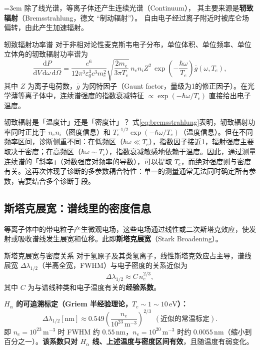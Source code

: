 \documentclass[12pt,a4paper,openany,oneside]{book}
\newcommand{\diff}{\mathrm{d}}
\newcommand{\eps}{\varepsilon}
\begin{document}
{\emergencystretch=3em
除了线光谱，等离子体还产生连续光谱（Continuum），
其主要来源是\textbf{轫致辐射}（Bremsstrahlung，德文 ``制动辐射''）。
自由电子经过离子附近时被库仑场偏转，由此产生加速辐射。\par}

\begin{theorem}{轫致辐射功率谱}{}{}
对于非相对论性麦克斯韦电子分布，单位体积、单位频率、单位立体角的轫致辐射功率谱为
\begin{equation}
\frac{\diff P}{\diff V\,\diff\omega\,\diff\Omega} = \frac{e^6}{12\pi^3\eps_0^3 c^3 m_e^2}\sqrt{\frac{2m_e}{3\pi T_e}}\,n_e n_i Z^2\,\exp\!\left(-\frac{\hbar\omega}{T_e}\right) \bar{g}(\omega, T_e),
\label{eq:bremsstrahlung}
\end{equation}
其中 $Z$ 为离子电荷数，$\bar{g}$ 为冈特因子（Gaunt factor，量级为1的修正因子）。在光学薄等离子体中，连续谱强度的指数衰减特征 $\propto \exp(-\hbar\omega/T_e)$ 直接给出电子温度。
\end{theorem}

\begin{insight}{轫致辐射是「温度计」还是「密度计」？}{}
式\eqref{eq:bremsstrahlung}表明，轫致辐射功率同时正比于 $n_e n_i$（密度信息）和 $T_e^{-1/2}\exp(-\hbar\omega/T_e)$（温度信息）。但在不同频率区间，诊断侧重不同：在低频区（$\hbar\omega \ll T_e$），指数因子接近1，辐射强度主要取决于密度；在高频区（$\hbar\omega \sim T_e$），指数衰减敏感地依赖于温度。因此，通过测量连续谱的「斜率」（对数强度对频率的导数），可以提取 $T_e$，而绝对强度则与密度有关。这再次体现了诊断的多参数耦合特性：单一的测量通常无法同时确定所有参数，需要结合多个诊断手段。
\end{insight}

\subsection{斯塔克展宽：谱线里的密度信息}

等离子体中的带电粒子产生微观电场，这些电场通过线性或二次斯塔克效应，使发射或吸收谱线发生展宽和位移。此即\textbf{斯塔克展宽}（Stark Broadening）。

\begin{definition}{斯塔克展宽与密度关系}{}{}
对于氢原子及其类氢离子，线性斯塔克效应占主导，谱线展宽 $\Delta\lambda_{1/2}$（半高全宽，FWHM）与电子密度的关系近似为
\begin{equation}
\Delta\lambda_{1/2} \approx C\,n_e^{2/3},
\label{eq:stark-broadening}
\end{equation}
其中 $C$ 为与谱线种类和电子温度有关的\textbf{经验系数}。

\textbf{$H_\alpha$ 的可追溯标定（Griem 半经验理论，$T_e\sim1\sim10\,\mathrm{eV}$）：}
\[
\Delta\lambda_{1/2}[\mathrm{nm}]
\approx 0.549\left(\frac{n_e}{10^{23}\,\mathrm{m^{-3}}}\right)^{2/3}
\ \ (\text{近似的常温标定}).
\]
即 $n_e = 10^{23}\,\mathrm{m^{-3}}$ 时 FWHM 约 $0.55\,\mathrm{nm}$，$n_e = 10^{20}\,\mathrm{m^{-3}}$ 时约 $0.0055\,\mathrm{nm}$（缩小到百分之一）。\textbf{该系数只对 $H_\alpha$ 线、上述温度与密度区间有效}，且随温度有弱变化。
\end{definition}
\end{document}
